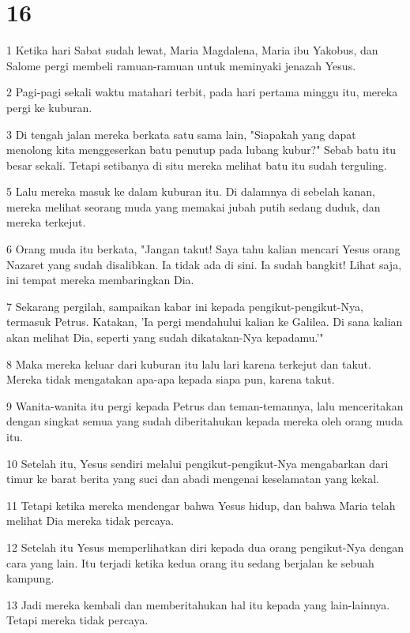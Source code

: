 \chapter{16}

\par 1 Ketika hari Sabat sudah lewat, Maria Magdalena, Maria ibu Yakobus, dan Salome pergi membeli ramuan-ramuan untuk meminyaki jenazah Yesus.
\par 2 Pagi-pagi sekali waktu matahari terbit, pada hari pertama minggu itu, mereka pergi ke kuburan.
\par 3 Di tengah jalan mereka berkata satu sama lain, "Siapakah yang dapat menolong kita menggeserkan batu penutup pada lubang kubur?" Sebab batu itu besar sekali. Tetapi setibanya di situ mereka melihat batu itu sudah terguling.
\par 5 Lalu mereka masuk ke dalam kuburan itu. Di dalamnya di sebelah kanan, mereka melihat seorang muda yang memakai jubah putih sedang duduk, dan mereka terkejut.
\par 6 Orang muda itu berkata, "Jangan takut! Saya tahu kalian mencari Yesus orang Nazaret yang sudah disalibkan. Ia tidak ada di sini. Ia sudah bangkit! Lihat saja, ini tempat mereka membaringkan Dia.
\par 7 Sekarang pergilah, sampaikan kabar ini kepada pengikut-pengikut-Nya, termasuk Petrus. Katakan, 'Ia pergi mendahului kalian ke Galilea. Di sana kalian akan melihat Dia, seperti yang sudah dikatakan-Nya kepadamu.'"
\par 8 Maka mereka keluar dari kuburan itu lalu lari karena terkejut dan takut. Mereka tidak mengatakan apa-apa kepada siapa pun, karena takut.
\par 9 Wanita-wanita itu pergi kepada Petrus dan teman-temannya, lalu menceritakan dengan singkat semua yang sudah diberitahukan kepada mereka oleh orang muda itu.
\par 10 Setelah itu, Yesus sendiri melalui pengikut-pengikut-Nya mengabarkan dari timur ke barat berita yang suci dan abadi mengenai keselamatan yang kekal.
\par 11 Tetapi ketika mereka mendengar bahwa Yesus hidup, dan bahwa Maria telah melihat Dia mereka tidak percaya.
\par 12 Setelah itu Yesus memperlihatkan diri kepada dua orang pengikut-Nya dengan cara yang lain. Itu terjadi ketika kedua orang itu sedang berjalan ke sebuah kampung.
\par 13 Jadi mereka kembali dan memberitahukan hal itu kepada yang lain-lainnya. Tetapi mereka tidak percaya.
